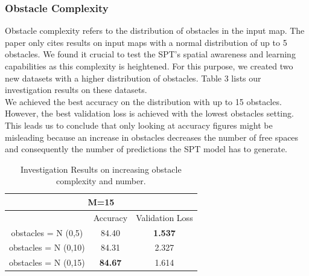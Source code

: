\subsubsection{Obstacle Complexity}
Obstacle complexity refers to the distribution of obstacles in the input map. The paper only cites results on input maps with a normal distribution of up to 5 obstacles. We found it crucial to test the SPT's spatial awareness and learning capabilities as this complexity is heightened. For this purpose, we created two new datasets with a higher distribution of obstacles. Table 3 lists our investigation results on these datasets.\\ 
We achieved the best accuracy on the distribution with up to 15 obstacles. However, the best validation loss is achieved with the lowest obstacles setting. This leads us to conclude that only looking at accuracy figures might be misleading because an increase in obstacles decreases the number of free spaces and consequently the number of predictions the SPT model has to generate.
\begin{table}[]
\begin{center}
\begin{tabular}{@{}ccc@{}}
\toprule
\multicolumn{3}{c}{M=15}                                \\ \midrule
                     & Accuracy       & Validation Loss \\ \midrule
obstacles = N (0,5)  & 84.40          & \textbf{1.537}  \\
obstacles = N (0,10) & 84.31          & 2.327           \\
obstacles = N (0,15) & \textbf{84.67} & 1.614           \\ \bottomrule
\end{tabular}
\end{center}
\caption{Investigation Results on increasing obstacle complexity and number.}
\end{table}

